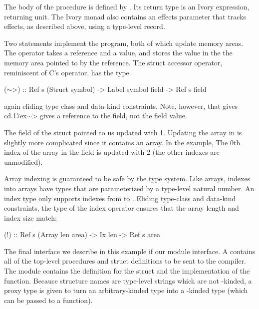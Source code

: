 The body of the procedure is defined by .  Its return type is an Ivory
expression, returning unit.  The Ivory monad also contains an effects parameter
that tracks effects, as described above, using a type-level record.

\newcommand{\mytilde}{\raise.17ex\hbox{$\scriptstyle\mathtt{\sim}$}}

Two statements implement the program, both of which update memory areas.  The
 operator takes a reference and a value, and stores the value in the
the memory area pointed to by the reference.  The struct accessor operator,
reminiscent of C's \cd{->} operator, has the type
\begin{code}
(\(\sim\)>) :: Ref s (Struct symbol)
      -> Label symbol field -> Ref s field
\end{code}
\noindent
again eliding type class and data-kind constraints.  Note, however, that
gives cd{\mytilde{}>} gives a reference to the field, not the field value.

The  field of the struct pointed to us updated with 1.  Updating the
array in  is slightly more complicated since it contains an array. In
the example, The 0th index of the array in the  field is updated with 2
(the other indexes are unmodified).

Array indexing is guaranteed to be safe by the type system.  Like arrays,
indexes into arrays have types that are parameterized by a type-level natural
number.  An index type  only supports indexes from  to .
Eliding type-class and data-kind constraints, the type of the index operator
ensures that the array length and index size match:
\begin{code}
(!) :: Ref s (Array len area) -> Ix len -> Ref s area
\end{code}

The final interface we describe in this example if our module interface.
A  contains all of the top-level procedures and struct definitions to
be sent to the compiler.  The module  contains the definition
for the struct and the implementation of the function.  Because structure names
are type-level strings which are not \cd{*}-kinded, a proxy type is given to
turn an arbitrary-kinded type into a \cd{*}-kinded type (which can be passed to
a function).



